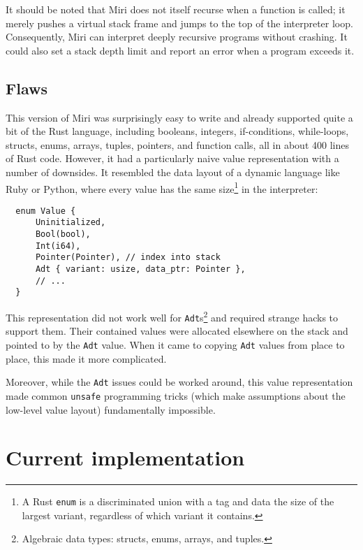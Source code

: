 \documentclass[twocolumn]{article}
\newcommand{\rust}[1]{\texttt{#1}}
\begin{document}
It should be noted that Miri does not itself recurse when a function is called; it merely pushes a
virtual stack frame and jumps to the top of the interpreter loop. Consequently, Miri can interpret
deeply recursive programs without crashing. It could also set a stack depth limit and report an
error when a program exceeds it.

\subsection{Flaws}

This version of Miri was surprisingly easy to write and already supported quite a bit of the Rust
language, including booleans, integers, if-conditions, while-loops, structs, enums, arrays, tuples,
pointers, and function calls, all in about 400 lines of Rust code. However, it had a particularly
naive value representation with a number of downsides. It resembled the data layout of a dynamic
language like Ruby or Python, where every value has the same size\footnote{A Rust \rust{enum} is a
discriminated union with a tag and data the size of the largest variant, regardless of which variant
it contains.} in the interpreter:

\begin{verbatim}
  enum Value {
      Uninitialized,
      Bool(bool),
      Int(i64),
      Pointer(Pointer), // index into stack
      Adt { variant: usize, data_ptr: Pointer },
      // ...
  }
\end{verbatim}

This representation did not work well for \rust{Adt}s\footnote{Algebraic data types: structs, enums,
arrays, and tuples.} and required strange hacks to support them. Their contained values were
allocated elsewhere on the stack and pointed to by the \rust{Adt} value. When it came to copying
\rust{Adt} values from place to place, this made it more complicated.

Moreover, while the \rust{Adt} issues could be worked around, this value representation made common
\rust{unsafe} programming tricks (which make assumptions about the low-level value layout)
fundamentally impossible.


\section{Current implementation}
\end{document}
